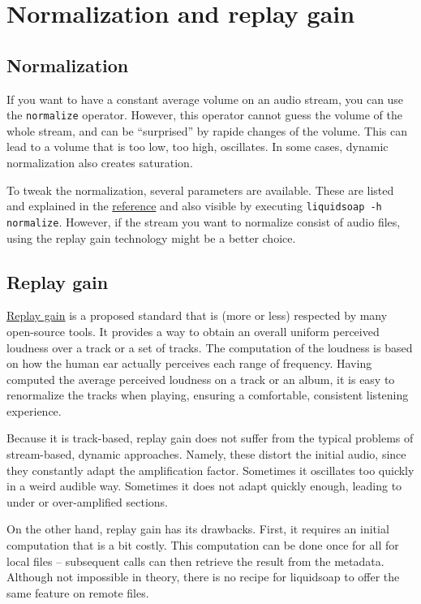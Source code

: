 \section{Normalization and replay gain}
\subsection{Normalization}
If you want to have a constant average volume on an audio stream, you can use the \verb+normalize+ operator. However, this operator cannot guess the volume of the whole stream, and can be ``surprised'' by rapide changes of the volume. This can lead to a volume that is too low, too high, oscillates. In some cases, dynamic normalization also creates saturation.

To tweak the normalization, several parameters are available. These are listed and explained in the \href{reference.html}{reference} and also visible by executing \verb+liquidsoap -h normalize+. However, if the stream you want to normalize consist of audio files, using the replay gain technology might be a better choice.

\subsection{Replay gain}
\href{http://www.replaygain.org}{Replay gain} is a proposed standard that is (more or less) respected by many open-source tools. It provides a way to obtain an overall uniform perceived loudness over a track or a set of tracks. The computation of the loudness is based on how the human ear actually perceives each range of frequency. Having computed the average perceived loudness on a track or an album, it is easy to renormalize the tracks when playing, ensuring a comfortable, consistent listening experience.

Because it is track-based, replay gain does not suffer from the typical problems of stream-based, dynamic approaches. Namely, these distort the initial audio, since they constantly adapt the amplification factor. Sometimes it oscillates too quickly in a weird audible way. Sometimes it does not adapt quickly enough, leading to under or over-amplified sections.

On the other hand, replay gain has its drawbacks. First, it requires an initial computation that is a bit costly. This computation can be done once for all for local files -- subsequent calls can then retrieve the result from the metadata. Although not impossible in theory, there is no recipe for liquidsoap to offer the same feature on remote files.

